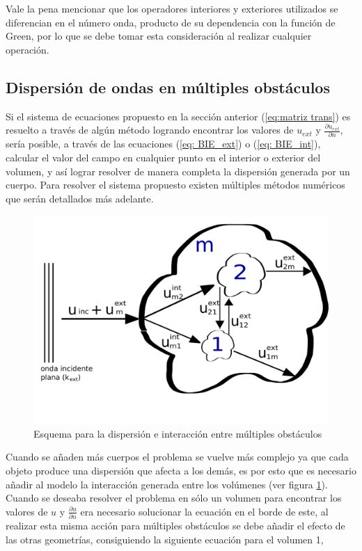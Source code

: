 \documentclass[12pt,letterpaper]{article}
\numberwithin{equation}{section}
\begin{document}
Vale la pena mencionar que los operadores interiores y exteriores utilizados se diferencian en el número onda, producto de su dependencia con la función de Green, por lo que se debe tomar esta consideración al realizar cualquier operación.

\pagebreak
\subsection{Dispersión de ondas en múltiples obstáculos}
Si el sistema de ecuaciones propuesto en la sección anterior (\ref{eq:matriz trans}) es resuelto a través de algún método logrando encontrar los valores de $u_{ext}$ y $\frac{\partial u_{ext}}{\partial n}$, sería posible, a través de las ecuaciones (\ref{eq: BIE_ext}) o (\ref{eq: BIE_int}), calcular el valor del campo en cualquier punto en el interior o exterior del volumen, y así lograr resolver de manera completa la dispersión generada por un cuerpo. Para resolver el sistema propuesto existen múltiples métodos numéricos que serán detallados más adelante.

\begin{figure}[H]
	\centering\includegraphics[scale=0.5]{Imagenes/multi_obstaculos.png}
	\caption{Esquema para la dispersión e interacción entre múltiples obstáculos}
	\label{fig:esquema_multi_obstaculos}
\end{figure}

Cuando se añaden más cuerpos el problema se vuelve más complejo ya que cada objeto produce una dispersión que afecta a los demás, es por esto que es necesario añadir al modelo la interacción generada entre los volúmenes \cite{Multiple scattering} (ver figura \ref{fig:esquema_multi_obstaculos}). Cuando se deseaba resolver el problema en sólo un volumen para encontrar los valores de $u$ y $\frac{\partial u}{\partial n}$ era necesario solucionar la ecuación en el borde de este, al realizar esta misma acción para múltiples obstáculos se debe añadir el efecto de las otras geometrías, consiguiendo la siguiente ecuación para el volumen 1,
\end{document}

